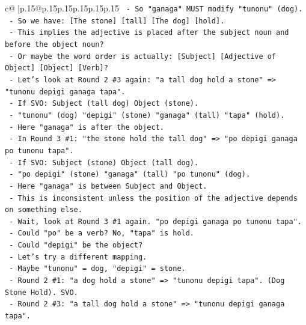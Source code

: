 \documentclass{article}
\begin{document}
{\begin{supertabular}{c@{$\;$}|p{.15\linewidth}@{}p{.15\linewidth}p{.15\linewidth}p{.15\linewidth}p{.15\linewidth}p{.15\linewidth}}
{{{\texttt{              {-} So "ganaga" MUST modify "tunonu" (dog).} \\
\texttt{              {-} So we have: {[}The stone{]} {[}tall{]} {[}The dog{]} {[}hold{]}.} \\
\texttt{              {-} This implies the adjective is placed after the subject noun and before the object noun?} \\
\texttt{              {-} Or maybe the word order is actually: {[}Subject{]} {[}Adjective of Object{]} {[}Object{]} {[}Verb{]}?} \\
\texttt{              {-} Let's look at Round 2 \#3 again: "a tall dog hold a stone" => "tunonu depigi ganaga tapa".} \\
\texttt{              {-} If SVO: Subject (tall dog) Object (stone).} \\
\texttt{              {-} "tunonu" (dog) "depigi" (stone) "ganaga" (tall) "tapa" (hold).} \\
\texttt{              {-} Here "ganaga" is after the object.} \\
\texttt{              {-} In Round 3 \#1: "the stone hold the tall dog" => "po depigi ganaga po tunonu tapa".} \\
\texttt{              {-} If SVO: Subject (stone) Object (tall dog).} \\
\texttt{              {-} "po depigi" (stone) "ganaga" (tall) "po tunonu" (dog).} \\
\texttt{              {-} Here "ganaga" is between Subject and Object.} \\
\texttt{              {-} This is inconsistent unless the position of the adjective depends on something else.} \\
\texttt{              {-} Wait, look at Round 3 \#1 again. "po depigi ganaga po tunonu tapa".} \\
\texttt{              {-} Could "po" be a verb? No, "tapa" is hold.} \\
\texttt{              {-} Could "depigi" be the object?} \\
\texttt{              {-} Let's try a different mapping.} \\
\texttt{              {-} Maybe "tunonu" = dog, "depigi" = stone.} \\
\texttt{              {-} Round 2 \#1: "a dog hold a stone" => "tunonu depigi tapa". (Dog Stone Hold). SVO.} \\
\texttt{              {-} Round 2 \#3: "a tall dog hold a stone" => "tunonu depigi ganaga tapa".} \\
}}}
\end{supertabular}}
\end{document}
